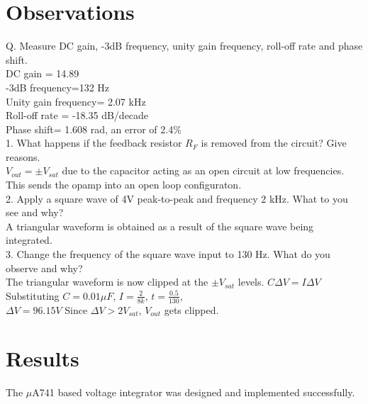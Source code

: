 \documentclass[12pt, titlepage]{article}
\theoremstyle{definition}
\begin{document}
  \newpage
  \section{Observations}
  Q. Measure DC gain, -3dB frequency, unity gain frequency, roll-off rate and phase shift.\\
   DC gain = 14.89 \\
  -3dB frequency=132 Hz\\
   Unity gain frequency= 2.07 kHz \\
   Roll-off rate = -18.35 dB/decade\\
   Phase shift= 1.608 rad, an error of 2.4\% \\
   
  1. What happens if the feedback resistor $R_{F}$ is removed from the circuit? Give reasons.\\
$V_{out}=\pm V_{sat}$ due to the capacitor acting as an open circuit at low frequencies. This sends the opamp into an open loop configuraton. \\

2. Apply a square wave of 4V peak-to-peak and frequency 2 kHz. What to you see and why?\\
A triangular waveform is obtained as a result of the square wave being integrated. \\

3. Change the frequency of the square wave input to 130 Hz. What do you observe and why?\\
The triangular waveform is now clipped at the $\pm V_{sat}$ levels.
$C\Delta V=I\Delta V$\\
Substituting $C=0.01\mu F$, $I=\frac{2}{8k}$, $t=\frac{0.5}{130}$, \\
$\Delta V = 96.15 V$
Since $\Delta V > 2V_{sat}$, $V_{out}$ gets clipped.
 

  \newpage
  \section{Results}
 The $\mu$A741 based voltage integrator was designed and implemented successfully.
\end{document}
